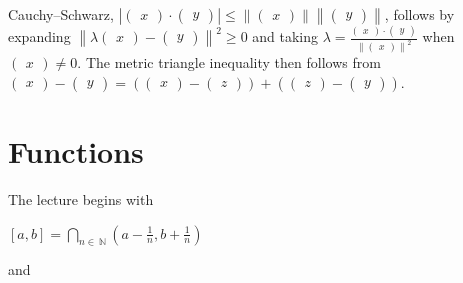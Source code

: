 Cauchy--Schwarz, \(\left| {\begin{pmatrix}
x
\end{pmatrix} \cdot \begin{pmatrix}
y
\end{pmatrix}} \right| \leq \left\| \begin{pmatrix}
x
\end{pmatrix} \right\|\left\| \begin{pmatrix}
y
\end{pmatrix} \right\|\), follows by expanding \(\left\| {\lambda\begin{pmatrix}
x
\end{pmatrix} - \begin{pmatrix}
y
\end{pmatrix}} \right\|^{2} \geq 0\) and taking \(\lambda = \frac{\begin{pmatrix}
x
\end{pmatrix} \cdot \begin{pmatrix}
y
\end{pmatrix}}{\left\| \begin{pmatrix}
x
\end{pmatrix} \right\|^{2}}\) when \(\begin{pmatrix}
x
\end{pmatrix} \neq 0\). The metric triangle inequality then follows from \(\begin{pmatrix}
x
\end{pmatrix} - \begin{pmatrix}
y
\end{pmatrix} = \left( {\begin{pmatrix}
x
\end{pmatrix} - \begin{pmatrix}
z
\end{pmatrix}} \right) + \left( {\begin{pmatrix}
z
\end{pmatrix} - \begin{pmatrix}
y
\end{pmatrix}} \right)\).

\section{Functions}

The lecture begins with

\(\left\lbrack {a,b} \right\rbrack = \bigcap_{n \in \ \mathbb{N}}\left( {a - \frac{1}{n},b + \frac{1}{n}} \right)\)

and

